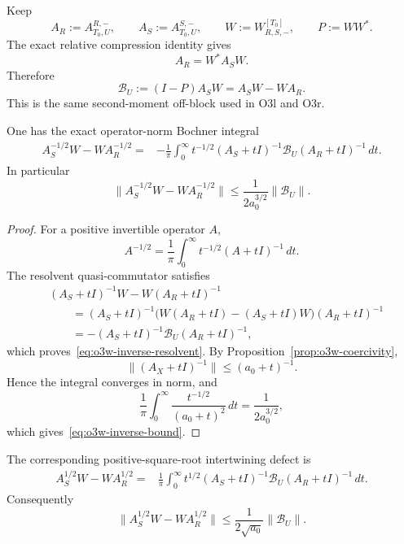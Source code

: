 Keep
\[
 A_R:=A_{T_0,U}^{R,-},
 \qquad
 A_S:=A_{T_0,U}^{S,-},
 \qquad
 W:=W_{R,S,-}^{[T_0]},
 \qquad
 P:=WW^*.
\]
The exact relative compression identity gives
\[
 A_R=W^*A_SW.
\]
Therefore
\[
 \boxed{
 \mathscr B_U
 :=(I-P)A_SW
 =A_SW-WA_R.
 }
\tag{O3W.4}\label{eq:o3w-B-intertwining}
\]
This is the same second-moment off-block used in O3l and O3r.

\begin{proposition}
\label{prop:o3w-inverse-resolvent}
One has the exact operator-norm Bochner integral
\[
 \boxed{
 \begin{aligned}
 A_S^{-1/2}W-WA_R^{-1/2}
 ={}&-\frac1\pi\int_0^\infty t^{-1/2}
 (A_S+tI)^{-1}\mathscr B_U(A_R+tI)^{-1}\,dt.
 \end{aligned}
 }
\tag{O3W.5}\label{eq:o3w-inverse-resolvent}
\]
In particular
\[
 \boxed{
 \|A_S^{-1/2}W-WA_R^{-1/2}\|
 \le\frac1{2a_0^{3/2}}\|\mathscr B_U\|.
 }
\tag{O3W.6}\label{eq:o3w-inverse-bound}
\]
\end{proposition}

\begin{proof}
For a positive invertible operator $A$,
\[
 A^{-1/2}
 =\frac1\pi\int_0^\infty t^{-1/2}(A+tI)^{-1}\,dt.
\]
The resolvent quasi-commutator satisfies
\[
\begin{aligned}
 &(A_S+tI)^{-1}W-W(A_R+tI)^{-1}\\
 &\qquad
 =(A_S+tI)^{-1}
 \bigl(W(A_R+tI)-(A_S+tI)W\bigr)
 (A_R+tI)^{-1}\\
 &\qquad
 =-(A_S+tI)^{-1}\mathscr B_U(A_R+tI)^{-1},
\end{aligned}
\]
which proves~\eqref{eq:o3w-inverse-resolvent}.  By
Proposition~\ref{prop:o3w-coercivity},
\[
 \|(A_X+tI)^{-1}\|\le(a_0+t)^{-1}.
\]
Hence the integral converges in norm, and
\[
 \frac1\pi\int_0^\infty
 \frac{t^{-1/2}}{(a_0+t)^2}\,dt
 =\frac1{2a_0^{3/2}},
\]
which gives~\eqref{eq:o3w-inverse-bound}.
\end{proof}

\begin{proposition}
\label{prop:o3w-square-resolvent}
The corresponding positive-square-root intertwining defect is
\[
 \boxed{
 \begin{aligned}
 A_S^{1/2}W-WA_R^{1/2}
 ={}&\frac1\pi\int_0^\infty t^{1/2}
 (A_S+tI)^{-1}\mathscr B_U(A_R+tI)^{-1}\,dt.
 \end{aligned}
 }
\tag{O3W.7}\label{eq:o3w-square-resolvent}
\]
Consequently
\[
 \boxed{
 \|A_S^{1/2}W-WA_R^{1/2}\|
 \le\frac1{2\sqrt{a_0}}\|\mathscr B_U\|.
 }
\tag{O3W.8}\label{eq:o3w-square-bound}
\]
\end{proposition}

